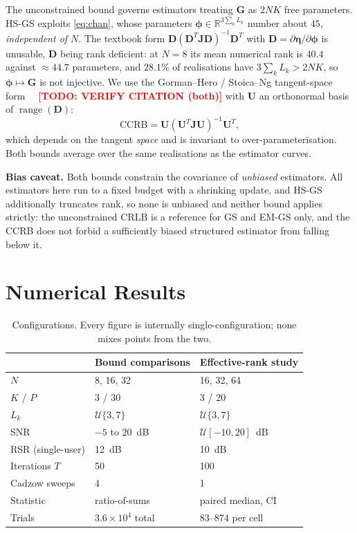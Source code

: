 \documentclass[journal]{IEEEtran}
\newcommand{\todo}[1]{\textcolor{red}{\textbf{[TODO: #1]}}}
\DeclareMathOperator{\range}{range}
\newcommand{\bG}{\mathbf{G}}
\newcommand{\bJ}{\mathbf{J}}
\newcommand{\bD}{\mathbf{D}}
\newcommand{\bU}{\mathbf{U}}
\begin{document}
The unconstrained bound governs estimators treating $\bG$ as $2NK$ free
parameters. HS-GS exploits \eqref{eq:chan}, whose parameters
$\boldsymbol\phi\in\mathbb{R}^{3\sum_k L_k}$ number about $45$,
\emph{independent of $N$}. The textbook form $\bD(\bD^T\bJ\bD)^{-1}\bD^T$ with
$\bD=\partial\boldsymbol\eta/\partial\boldsymbol\phi$ is unusable, $\bD$ being
rank deficient: at $N=8$ its mean numerical rank is $40.4$ against $\approx
44.7$ parameters, and $28.1\%$ of realisations have $3\sum_k L_k>2NK$, so
$\boldsymbol\phi\mapsto\bG$ is not injective. We use the Gorman--Hero /
Stoica--Ng tangent-space form~\cite{gorman1990,stoica1998}~%
\todo{VERIFY CITATION (both)} with $\bU$ an orthonormal basis of
$\range(\bD)$:
\begin{equation}
\mathrm{CCRB}=\bU(\bU^T\bJ\bU)^{-1}\bU^T,
\label{eq:ccrb}
\end{equation}
which depends on the tangent \emph{space} and is invariant to
over-parameterisation. Both bounds average over the same realisations as the
estimator curves.

\textbf{Bias caveat.} Both bounds constrain the covariance of \emph{unbiased}
estimators. All estimators here run to a fixed budget with a shrinking update,
and HS-GS additionally truncates rank, so none is unbiased and neither bound
applies strictly: the unconstrained CRLB is a reference for GS and EM-GS only,
and the CCRB does not forbid a sufficiently biased structured estimator from
falling below it.

\section{Numerical Results}
\label{sec:results}

\begin{table}[!t]
\caption{Configurations. Every figure is internally single-configuration;
none mixes points from the two.}
\label{tab:params}
\centering
\small
\begin{tabular}{lll}
\toprule
 & Bound comparisons & Effective-rank study \\
\midrule
$N$ & 8, 16, 32 & 16, 32, 64 \\
$K$ / $P$ & 3 / 30 & 3 / 20 \\
$L_k$ & $\mathcal{U}\{3,7\}$~\cite{xu2025} & $\mathcal{U}\{3,7\}$~\cite{xu2025} \\
SNR & $-5$ to $20$~dB & $\mathcal{U}[-10,20]$~dB \\
RSR (single-user) & 12~dB & 10~dB \\
Iterations $T$ & 50 & 100 \\
Cadzow sweeps & 4 & 1 \\
Statistic & ratio-of-sums & paired median, CI \\
Trials & $3.6\times10^4$ total & 83--874 per cell \\
\bottomrule
\end{tabular}
\end{table}
\end{document}
